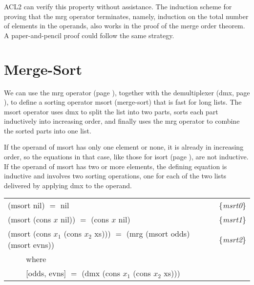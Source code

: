 ACL2 can verify this property without assistance.
The induction scheme for proving that
the \textsf{mrg} operator terminates,
namely, induction on the total number of elements in the operands,
also works in the proof of the merge order theorem.
A paper-and-pencil proof could follow the same strategy.

\begin{exercises}




\end{exercises}

\section{Merge-Sort}
\label{sec:msort}

We can use the \textsf{mrg} operator (page \pageref{defun:mrg}),
together with the demultiplexer (\textsf{dmx}, page \pageref{dmx-defun}),
to define a sorting operator \textsf{msort} (merge-sort) that is fast for long lists.
The \textsf{msort} operator uses \textsf{dmx} to split the list into two parts,
sorts each part inductively into increasing order, and finally
uses the \textsf{mrg} operator to combine the sorted parts into one list.

If the operand of \textsf{msort} has only one element or none,
it is already in increasing order,
so the equations in that case,
like those for \textsf{isort} (page \pageref{eq:isrt0}),
are not inductive.
If the operand of \textsf{msort} has two or more elements,
the defining equation is inductive and
involves two sorting operations,
one for each of the two lists delivered by applying
\textsf{dmx} to the operand.

\begin{center}
\label{eq:msrt1}
\label{eq:msrt0}
\label{eq:msrt2}
\begin{tabular}{ll}
\textsf{(msort nil) $=$ nil}                        & \{\emph{msrt0}\} \\
\textsf{(msort (cons $x$ nil)) $=$ (cons $x$ nil)} & \{\emph{msrt1}\} \\
\textsf{(msort (cons $x_1$ (cons $x_2$ xs))) $=$ (mrg (msort odds) (msort evns))} & \{\emph{msrt2}\} \\
 ~~~~ where  & \\
 ~~~~ \textsf{[odds, evns] $=$ (dmx (cons $x_1$ (cons $x_2$ xs)))} & \\
\end{tabular}
\end{center}

